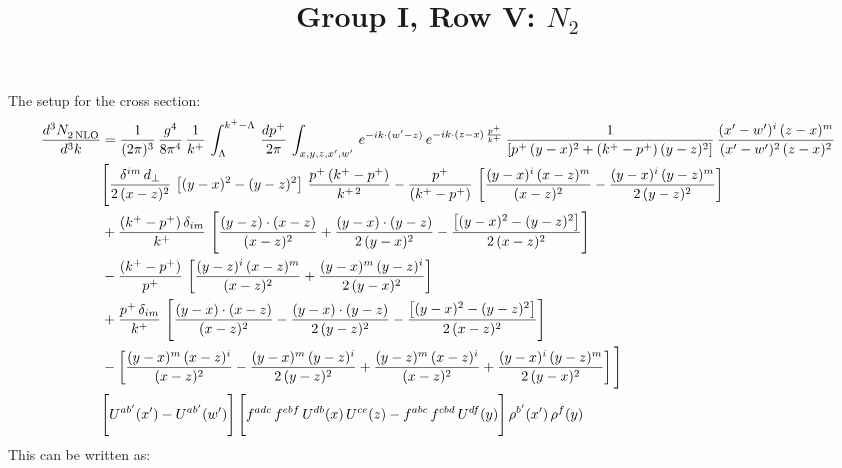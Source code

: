 \documentclass[9pt]{article}
\title{Group I, Row V: $N_{2}$}
\author{}
\date{}
\numberwithin{equation}{section}
\begin{document}
\maketitle
The setup for the cross section: 
\begin{align}
    \frac{d^{3}N_{2\,\rm NLO}^{\rm}}{d^{3}k}  & =  \frac{1}{(2\pi)^{3}}\,\frac{g^{4}}{8\pi^{4}}\,\frac{1}{k^{+}}\,\int_{\Lambda}^{k^{+}-\Lambda}\, \frac{dp^{+}}{2\pi} \,\int_{x,y,z,x',w'}\,e^{-ik\cdot(w'-z)}\,e^{-ik\cdot (z-x)\,\frac{p^{+}}{k^{+}}}\,\frac{1}{\left[p^{+}\,(y-x)^{2}+(k^{+}-p^{+})\,(y-z)^{2}\right]}\, \frac{(x'-w')^{i}\,(z-x)^{m}}{(x'-w')^{2}\,(z-x)^{2}} \notag \\ & \Bigg[\frac{\delta^{im}\,d_{\perp}}{2\,(x-z)^{2}}\,\left[(y-x)^{2}-(y-z)^{2}\right]\,\frac{p^{+}\,(k^{+}-p^{+})}{k^{+\,2}}-\frac{p^{+}}{(k^{+}-p^{+})}\,\left[\frac{(y-x)^{i}\,(x-z)^{m}}{(x-z)^{2}}-\frac{(y-x)^{i}\,(y-z)^{m}}{2\,(y-z)^{2}}\right]\notag \\ & +\frac{(k^{+}-p^{+})\,\delta_{im}}{k^{+}}\,\left[\frac{(y-z)\cdot (x-z)}{(x-z)^{2}}+\frac{(y-x)\cdot (y-z)}{2\,(y-x)^{2}}-\frac{\left[(y-x)^{2}-(y-z)^{2}\right]}{2\,(x-z)^{2}}\right]\notag \\ & -\frac{(k^{+}-p^{+})}{p^{+}}\,\left[\frac{(y-z)^{i}\,(x-z)^{m}}{(x-z)^{2}}+\frac{(y-x)^{m}\,(y-z)^{i}}{2\,(y-x)^{2}}\right]\notag \\ & +\frac{p^{+}\,\delta_{im}}{k^{+}}\,\left[\frac{(y-x)\cdot (x-z)}{(x-z)^{2}}-\frac{(y-x)\cdot (y-z)}{2\,(y-z)^{2}}-\frac{\left[(y-x)^{2}-(y-z)^{2}\right]}{2\,(x-z)^{2}}\right]\notag \\ &-\left[\frac{(y-x)^{m}\,(x-z)^{i}}{(x-z)^{2}}-\frac{(y-x)^{m}\,(y-z)^{i}}{2\,(y-z)^{2}}+\frac{(y-z)^{m}\,(x-z)^{i}}{(x-z)^{2}}+\frac{(y-x)^{i}\,(y-z)^{m}}{2\,(y-x)^{2}}\right]\Bigg] \notag \\ & \Bigg[U^{ab'}(x')-U^{ab'}(w')\Bigg]\,\Bigg[f^{adc}\,f^{ebf}\,U^{db}(x)\,U^{ce}(z)-f^{abc}\,f^{cbd}\,U^{df}(y)\Bigg]\,\rho^{b'}(x')\,\rho^{f}(y)
\end{align}
This can be written as: 
\end{document}
